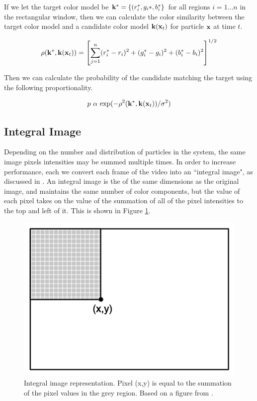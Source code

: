 \documentclass[12pt]{article}
\begin{document}
If we let the target color model be ${\bf k}^* = \{ (r_i^*, g_i*, b_i^* \}$ for all regions $i = 1 \dots n$ in the rectangular window, then we can calculate the color similarity between the target color model and a candidate color model ${\bf k}({\bf x}_t)$ for particle ${\bf x}$ at time $t$.

\begin{equation}
\rho({\bf k}^*, {\bf k}({\bf x}_t)) = \left [ \sum^n_{j = 1} (r_i^* - r_i)^2 + (g_i^* - g_i)^2 + (b_i^* - b_i)^2 \right ] ^{1/2}
\label{eq:colorsimilarity}
\end{equation}

Then we can calculate the probability of the candidate matching the target using the following proportionality.

\begin{equation}
p \text{ $\alpha$ exp} (-\rho^2({\bf k}^*, {\bf k}({\bf x}_t)) / \sigma^2)
\label{eq:colorprob}
\end{equation}


\subsection{Integral Image}

Depending on the number and distribution of particles in the system, the same image pixels intensities may be summed multiple times. In order to increase performance, each we convert each frame of the video into an ``integral image", as discussed in \cite{facedetection}. An integral image is the of the same dimensions as the original image, and maintains the same number of color components, but the value of each pixel takes on the value of the summation of all of the pixel intensities to the top and left of it. This is shown in Figure \ref{fig:integralimg}.
 
 \begin{figure}[H]
\centering
\includegraphics[scale=.4]{img/IntegralImage.jpg}
\caption{Integral image representation. Pixel (x,y) is equal to the summation of the pixel values in the grey region. Based on a figure from \cite{facedetection}.}
\label{fig:integralimg}
\end{figure}
\end{document}
